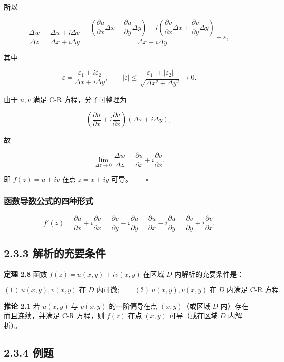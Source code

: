 所以

\[
\frac{\Delta w}{\Delta z}
=\frac{\Delta u+i\Delta v}{\Delta x+i\Delta y}
=\frac{\left(\dfrac{\partial u}{\partial x}\Delta x+\dfrac{\partial u}{\partial y}\Delta y\right)+
i\left(\dfrac{\partial v}{\partial x}\Delta x+\dfrac{\partial v}{\partial y}\Delta y\right)}
{\Delta x+i\Delta y}+\varepsilon,
\]

其中

\[
\varepsilon=\frac{\varepsilon_1+i\varepsilon_2}{\Delta x+i\Delta y},\qquad
|\varepsilon|\le\frac{|\varepsilon_1|+|\varepsilon_2|}{\sqrt{\Delta x^2+\Delta y^2}}\to0 .
\]

由于 \(u,v\) 满足 C-R 方程，分子可整理为

\[
\left(\frac{\partial u}{\partial x}+i\frac{\partial v}{\partial x}\right)(\Delta x+i\Delta y),
\]

故

\[
\lim_{\Delta z\to0}\frac{\Delta w}{\Delta z}
=\frac{\partial u}{\partial x}+i\frac{\partial v}{\partial x}.
\]

即 \(f(z)=u+iv\) 在点 \(z=x+iy\) 可导。\(\qquad\square\)

\subsubsection{函数导数公式的四种形式}\label{ux51fdux6570ux5bfcux6570ux516cux5f0fux7684ux56dbux79cdux5f62ux5f0f}

\[
f'(z)=\frac{\partial u}{\partial x}+i\frac{\partial v}{\partial x}
=\frac{\partial v}{\partial y}-i\frac{\partial u}{\partial y}
=\frac{\partial u}{\partial x}-i\frac{\partial u}{\partial y}
=\frac{\partial v}{\partial y}+i\frac{\partial v}{\partial x}.
\]

\subsection{2.3.3
解析的充要条件}\label{ux89e3ux6790ux7684ux5145ux8981ux6761ux4ef6}

\textbf{定理 2.8} 函数 \(f(z)=u(x,y)+iv(x,y)\) 在区域 \(D\)
内解析的充要条件是：

\[
(1)\ u(x,y),v(x,y)\text{ 在 }D\text{ 内可微};\qquad
(2)\ u(x,y),v(x,y)\text{ 在 }D\text{ 内满足 C-R 方程}.
\]

\textbf{推论 2.1} 若 \(u(x,y)\) 与 \(v(x,y)\) 的一阶偏导在点
\((x,y)\)（或区域 \(D\) 内）存在而且连续，并满足 C-R 方程，则 \(f(z)\)
在点 \((x,y)\) 可导（或在区域 \(D\) 内解析）。

\subsection{2.3.4 例题}\label{ux4f8bux9898}

